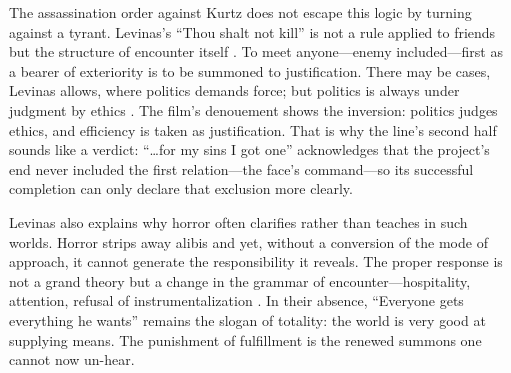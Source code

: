 The assassination order against Kurtz does not escape this logic by turning against a tyrant.
Levinas's ``Thou shalt not kill'' is not a rule applied to friends but the structure of
encounter itself \parencite[p.~199]{LevinasTI1969}. To meet anyone—enemy included—first as a
bearer of exteriority is to be summoned to justification. There may be cases, Levinas allows,
where politics demands force; but politics is always under judgment by ethics
\parencite[pp.~21--24]{LevinasTI1969}. The film's denouement shows the inversion: politics
judges ethics, and efficiency is taken as justification. That is why the line's second half
sounds like a verdict: ``\ldots for my sins I got one'' acknowledges that the project's end
never included the first relation—the face's command—so its successful completion can only
declare that exclusion more clearly.

Levinas also explains why horror often clarifies rather than teaches in such worlds. Horror
strips away alibis and yet, without a conversion of the mode of approach, it cannot generate the
responsibility it reveals. The proper response is not a grand theory but a change in the grammar
of encounter—hospitality, attention, refusal of instrumentalization
\parencite[pp.~200--206]{LevinasTI1969}. In their absence, ``Everyone gets everything he wants''
remains the slogan of totality: the world is very good at supplying means. The punishment of
fulfillment is the renewed summons one cannot now un-hear.
